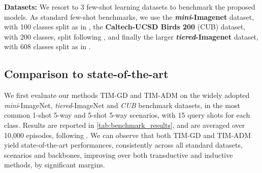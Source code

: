\documentclass{article}
\begin{document}
    \textbf{Datasets: } We resort to 3 few-shot learning  datasets to benchmark the proposed models. As standard few-shot benchmarks, we use the \textbf{\textit{mini}-Imagenet} \cite{matching_net} dataset, with 100 classes split as in \cite{ravi2016optimization}, the \textbf{Caltech-UCSD Birds 200} \cite{cub} (CUB) dataset, with 200 classes, split following \cite{closer_look}, and finally the larger \textbf{\textit{tiered}-Imagenet} dataset, with 608 classes split as in \cite{tiered_imagenet}.


    \subsection{Comparison to state-of-the-art}\label{sec:benchmark}

        We first evaluate our methods TIM-GD and TIM-ADM on the widely adopted \textit{mini}-ImageNet, \textit{tiered}-ImageNet and \textit{CUB} benchmark datasets, in the most common 1-shot 5-way and 5-shot 5-way scenarios, with 15 query shots for each class. Results are reported in \autoref{tab:benchmark_results}, and are averaged over 10,000 episodes, following \cite{simpleshot}. We can observe that both TIM-GD and TIM-ADM yield state-of-the-art performances, consistently across all standard datasets, scenarios and backbones, improving over both transductive and inductive methods, by significant margins. 
\end{document}

